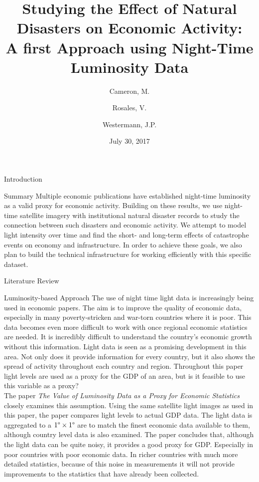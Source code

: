 \documentclass[12pt,fleqn,leqno,letterpaper]{article}
\title{
  Studying the Effect of Natural Disasters on Economic Activity:\\
  \large{A first Approach using Night-Time Luminosity Data}
}
\author{Cameron, M. \and Rosales, V. \and Westermann, J.P.}
\date{July 30, 2017}
\begin{document}
\maketitle
\newpage
\tableofcontents
\listoffigures
\listoftables

\newpage

\begin{section}{Introduction}
  \begin{subsection}{Summary}
    Multiple economic publications have established night-time luminosity as a valid proxy for economic activity. Building on these results, we use night-time satellite imagery with institutional natural disaster records to study the connection between such disasters and economic activity. We attempt to model light intensity over time and find the short- and long-term effects of catastrophe events on economy and infrastructure. In order to achieve these goals, we also plan to build the technical infrastructure for working efficiently with this specific dataset.
  \end{subsection}
  \begin{subsection}{Literature Review}
    \begin{subsubsection}{Luminosity-based Approach}
			The use of night time light data is increasingly being used in economic papers. The aim is to improve the quality of economic data, especially in many poverty-stricken and war-torn countries where it is poor. This data becomes even more difficult to work with once regional economic statistics are needed. It is incredibly difficult to understand the country's economic growth without this information. Light data is seen as a promising development in this area. Not only does it provide information for every country, but it also shows the spread of activity throughout each country and region. Throughout this paper light levels are used as a proxy for the GDP of an area, but is it feasible to use this variable as a proxy? \\
      The paper \textit{The Value of Luminosity Data as a Proxy for Economic Statistics} \cite{lightasproxy} closely examines this assumption. Using the same satellite light images as used in this paper, the paper compares light levels to actual GDP data. The light data is aggregated to a $1\degree\times 1\degree$ are to match the finest economic data available to them, although country level data is also examined. The paper concludes that, although the light data can be quite noisy, it provides a good proxy for GDP. Especially in poor countries with poor economic data. In richer countries with much more detailed statistics, because of this noise in measurements it will not provide improvements to the statistics that have already been collected.\\ 

\end{subsubsection}
\end{subsection}
\end{section}
\end{document}
